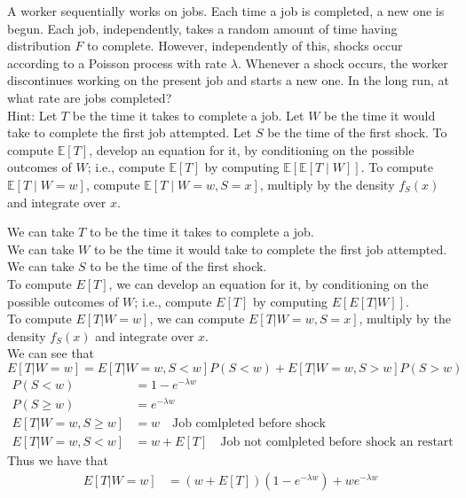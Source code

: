 \documentclass[answers,12pt,addpoints]{exam}
\begin{document}
\begin{questions}
    A worker sequentially works on jobs. Each time a job is completed, a new one is begun. Each
    job, independently, takes a random amount of time having distribution \(F\) to complete. However,
    independently of this, shocks occur according to a Poisson process with rate \(\lambda\). Whenever a shock
    occurs, the worker discontinues working on the present job and starts a new one. In the long run,
    at what rate are jobs completed?\\
    Hint: Let \(T\) be the time it takes to complete a job. Let \(W\) be the time it would take to complete
    the first job attempted. Let \(S\) be the time of the first shock. To compute \(\mathbb{E}[T]\), develop an
    equation for it, by conditioning on the possible outcomes of \(W\); i.e., compute \(\mathbb{E}[T]\) by computing
    \(\mathbb{E}[\mathbb{E}[T \mid W]]\). To compute \(\mathbb{E}[T \mid W = w]\), compute \(\mathbb{E}[T \mid W = w, S = x]\), multiply by the density
    \(f_S(x)\) and integrate over \(x\).
    \begin{solution}
        We can take $T$ to be the time it takes to complete a job.\\
        We can take $W$ to be the time it would take to complete the first job attempted.\\
        We can take $S$ to be the time of the first shock.\\
        To compute $E[T]$, we can develop an equation for it, by conditioning on the possible outcomes of $W$; i.e., compute $E[T]$ by computing $E[E[T | W]]$.\\
        To compute $E[T | W = w]$, we can compute $E[T | W = w, S = x]$, multiply by the density $f_S(x)$ and integrate over $x$.\\
        We can see that $E[T | W = w] = E[T | W = w, S < w]P(S < w) + E[T | W = w, S > w]P(S > w)$\\
        \begin{align*}
            P(S < w) &= 1 - e^{-\lambda w}\\
            P(S \geq w) &= e^{-\lambda w}\\
            E[T | W = w, S \geq w] &= w \quad \text{Job comlpleted before shock}\\
            E[T | W = w, S < w] &= w + E[T] \quad \text{Job not comlpleted before shock an restart}
        \end{align*}
        Thus we have that
        \begin{align*}
            E[T | W = w] &= (w + E[T])(1 - e^{-\lambda w}) + w e^{-\lambda w}\\

\end{align*}
\end{solution}
\end{questions}
\end{document}
